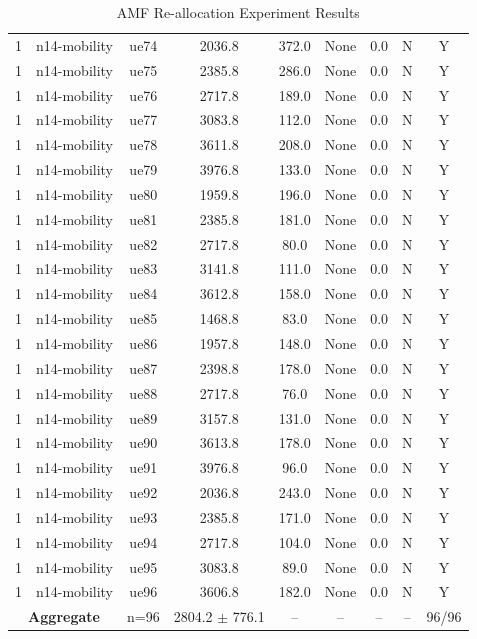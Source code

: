 \begin{table}[ht]
\begin{tabular}{|c|c|c|c|c|c|c|c|c|}
1 & n14-mobility & ue74 & 2036.8 & 372.0 & None & 0.0 & N & Y \\
1 & n14-mobility & ue75 & 2385.8 & 286.0 & None & 0.0 & N & Y \\
1 & n14-mobility & ue76 & 2717.8 & 189.0 & None & 0.0 & N & Y \\
1 & n14-mobility & ue77 & 3083.8 & 112.0 & None & 0.0 & N & Y \\
1 & n14-mobility & ue78 & 3611.8 & 208.0 & None & 0.0 & N & Y \\
1 & n14-mobility & ue79 & 3976.8 & 133.0 & None & 0.0 & N & Y \\
1 & n14-mobility & ue80 & 1959.8 & 196.0 & None & 0.0 & N & Y \\
1 & n14-mobility & ue81 & 2385.8 & 181.0 & None & 0.0 & N & Y \\
1 & n14-mobility & ue82 & 2717.8 & 80.0 & None & 0.0 & N & Y \\
1 & n14-mobility & ue83 & 3141.8 & 111.0 & None & 0.0 & N & Y \\
1 & n14-mobility & ue84 & 3612.8 & 158.0 & None & 0.0 & N & Y \\
1 & n14-mobility & ue85 & 1468.8 & 83.0 & None & 0.0 & N & Y \\
1 & n14-mobility & ue86 & 1957.8 & 148.0 & None & 0.0 & N & Y \\
1 & n14-mobility & ue87 & 2398.8 & 178.0 & None & 0.0 & N & Y \\
1 & n14-mobility & ue88 & 2717.8 & 76.0 & None & 0.0 & N & Y \\
1 & n14-mobility & ue89 & 3157.8 & 131.0 & None & 0.0 & N & Y \\
1 & n14-mobility & ue90 & 3613.8 & 178.0 & None & 0.0 & N & Y \\
1 & n14-mobility & ue91 & 3976.8 & 96.0 & None & 0.0 & N & Y \\
1 & n14-mobility & ue92 & 2036.8 & 243.0 & None & 0.0 & N & Y \\
1 & n14-mobility & ue93 & 2385.8 & 171.0 & None & 0.0 & N & Y \\
1 & n14-mobility & ue94 & 2717.8 & 104.0 & None & 0.0 & N & Y \\
1 & n14-mobility & ue95 & 3083.8 & 89.0 & None & 0.0 & N & Y \\
1 & n14-mobility & ue96 & 3606.8 & 182.0 & None & 0.0 & N & Y \\
\multicolumn{2}{|c|}{\textbf{Aggregate}} & n=96 & 2804.2 $\pm$ 776.1 & -- & -- & -- & -- & 96/96 \\
\hline
\end{tabular}
\caption{AMF Re-allocation Experiment Results}
\label{tab:amf_realloc}
\end{table}
